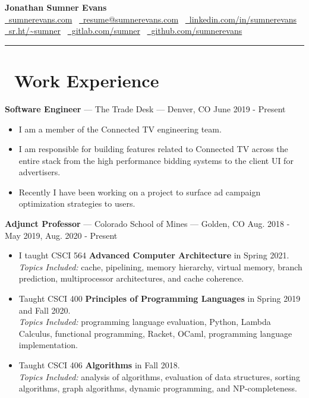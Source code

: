 \documentclass[10pt,letterpaper]{article}
\begin{document}
\begin{center}
    {\huge\textbf{Jonathan Sumner Evans}} \\
    \vspace{3pt}
    \href{https://sumnerevans.com}{\faGlobe\ sumnerevans.com}
    \textbar\ \href{mailto:resume@sumnerevans.com}{\faEnvelope\ resume@sumnerevans.com}
    \textbar\ \href{https://www.linkedin.com/in/sumnerevans}{\faLinkedin\ linkedin.com/in/sumnerevans} \\
    \href{https://sr.ht/~sumner}{\faCodeFork\ sr.ht/{\textasciitilde}sumner}
    \textbar\ \href{https://gitlab.com/sumner}{\faGitlab\ gitlab.com/sumner}
    \textbar\ \href{https://github.com/sumnerevans}{\faGithub\ github.com/sumnerevans}
    \rule{\textwidth}{0.5pt}
\end{center}

\section*{\faBriefcase\ Work Experience}
\textbf{Software Engineer} --- The Trade Desk --- Denver, CO
\hfill June 2019 - Present
\begin{itemize}
    \item I am a member of the Connected TV engineering team.
    \item I am responsible for building features related to Connected TV across
        the entire stack from the high performance bidding systems to the client
        UI for advertisers.
    \item Recently I have been working on a project to surface ad campaign
        optimization strategies to users.
\end{itemize}

\textbf{Adjunct Professor} --- Colorado School of Mines --- Golden, CO
\hfill Aug. 2018 - May 2019, Aug. 2020 - Present
\begin{itemize}
    \item I taught CSCI 564 \textbf{Advanced Computer Architecture} in Spring
        2021. \\
        \textit{Topics Included:} cache, pipelining, memory hierarchy, virtual
        memory, branch prediction, multiprocessor architectures, and cache
        coherence.
    \item Taught CSCI 400 \textbf{Principles of Programming Languages} in Spring
        2019 and Fall 2020. \\
        \textit{Topics Included:} programming language evaluation, Python,
        Lambda Calculus, functional programming, Racket, OCaml, programming
        language implementation.
    \item Taught CSCI 406 \textbf{Algorithms} in Fall 2018. \\
        \textit{Topics Included:} analysis of algorithms, evaluation of data
        structures, sorting algorithms, graph algorithms, dynamic programming,
        and NP-completeness.
\end{itemize}
\end{document}
